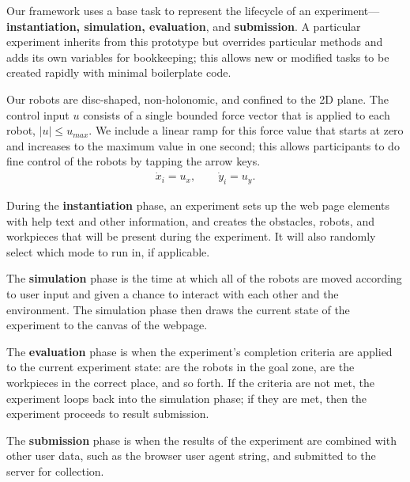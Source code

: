 Our framework uses a base task to represent the lifecycle of an experiment---{\bf  instantiation, simulation, evaluation}, and {\bf submission}. A particular experiment inherits from this prototype but overrides particular methods and adds its own variables for bookkeeping; this allows new or modified tasks to be created rapidly with minimal boilerplate code.

Our robots are disc-shaped, non-holonomic, and confined to the 2D plane.  The control input $u$ consists of a single bounded force vector that is applied to each robot, $|u|\le u_{max}$.  We include a linear ramp for this force value that starts at zero and increases to the maximum value in one second; this allows participants to do fine control of the robots by tapping the arrow keys.
\begin{align}\label{eq:sysmodel}
\dot{x}_i = u_x,  \qquad  \dot{y}_i = u_y.
 \end{align}

During the {\bf instantiation} phase, an experiment sets up the web page elements with help text and other information, and creates the obstacles, robots, and workpieces that will be present during the experiment. It will also randomly select which mode to run in, if applicable.

The {\bf simulation} phase is the time at which all of the robots are moved according to user input and given a chance to interact with each other and the environment. The simulation phase then draws the current state of the experiment to the canvas of the webpage.

The {\bf evaluation} phase is when the experiment's completion criteria are applied to the current experiment state: are the robots in the goal zone, are the workpieces in the correct place, and so forth. If the criteria are not met, the experiment loops back into the simulation phase; if they are met, then the experiment proceeds to result submission.

The {\bf submission} phase is when the results of the experiment are combined with other user data, such as the browser user agent string, and submitted to the server for collection.


